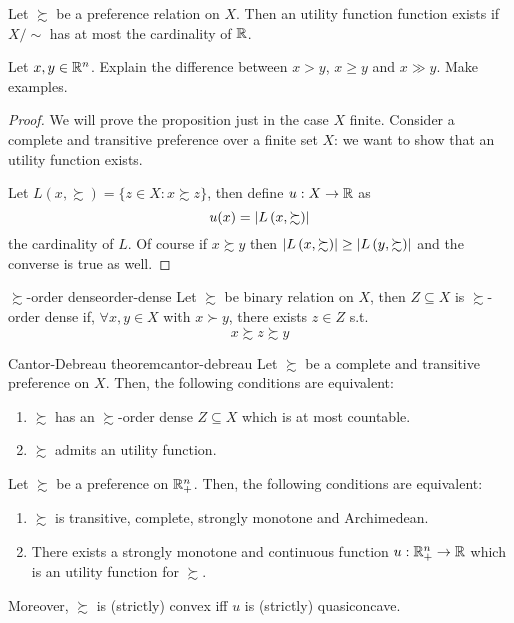 \documentclass[12pt]{extarticle}
\begin{document}
\begin{proposition}{}{}
    Let $\succsim$ be a preference relation on $X$.
    Then an utility function function exists if $X/\sim$ has at most the cardinality of $\mathbb{R}$.
\end{proposition}

\begin{proposition}{}{}
    Let $x, y \in \mathbb{R}^n$. Explain the difference between $x > y$, $x \geq y$ and $x \gg y$. Make examples.
\end{proposition}

\begin{proof}
    We will prove the proposition just in the case $X$ finite.
    Consider a complete and transitive preference over a finite set $X$:
    we want to show that an utility function exists.

    Let $L(x, \succsim) = \{ z \in X : x \succsim z \}$, then define $u: X \to \mathbb{R}$ as
    \begin{equation}
        u(x) = \abs{L\left(x, \succsim\right)}
    \end{equation}
    the cardinality of $L$.
    Of course if $x \succsim y$ then $\abs{L\left(x, \succsim\right)} \geq \abs{L\left(y, \succsim\right)}$
    and the converse is true as well.
\end{proof}

\begin{definition}{$\succsim$-order dense}{order-dense}
    Let $\succsim$ be binary relation on $X$, then $Z \subseteq X$ is $\succsim$-order dense if, $\forall x, y \in X$ with $x \succ y$, there exists $z \in Z$ s.t.
    \begin{equation}
        x \succsim z \succsim y
    \end{equation}
\end{definition}

\begin{theorem}{Cantor-Debreau theorem}{cantor-debreau}
    Let $\succsim$ be a complete and transitive preference on $X$.
    Then, the following conditions are equivalent:
    \begin{enumerate}[label=\roman*.]
        \item $\succsim$ has an $\succsim$-order dense $Z \subseteq X$ which is at most countable.
        \item $\succsim$ admits an utility function.
    \end{enumerate}
\end{theorem}

\begin{theorem}{}{}
    Let $\succsim$ be a preference on $\mathbb{R}^n_+$.
    Then, the following conditions are equivalent:
    \begin{enumerate}[label=\roman*.]
        \item $\succsim$ is transitive, complete, strongly monotone and Archimedean.
        \item There exists a strongly monotone and continuous function $u: \mathbb{R}^n_+ \to \mathbb{R}$ which is an utility function for $\succsim$.
    \end{enumerate}

    Moreover, $\succsim$ is (strictly) convex iff $u$ is (strictly) quasiconcave.
\end{theorem}
\end{document}

